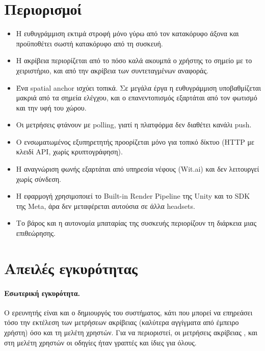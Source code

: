 \section{Περιορισμοί}
\label{sec:limitations}

\begin{itemize}
  \item Η ευθυγράμμιση εκτιμά στροφή μόνο γύρω από τον κατακόρυφο άξονα και προϋποθέτει σωστή κατακόρυφο από τη συσκευή.
  \item Η ακρίβεια περιορίζεται από το πόσο καλά ακουμπά ο χρήστης το σημείο με το χειριστήριο, και από την ακρίβεια των συντεταγμένων αναφοράς.
  \item Ένα spatial anchor ισχύει τοπικά. Σε μεγάλα έργα η ευθυγράμμιση υποβαθμίζεται μακριά από τα σημεία ελέγχου, και ο επανεντοπισμός εξαρτάται από τον φωτισμό και την υφή του χώρου.
  \item Οι μετρήσεις φτάνουν με polling, γιατί η πλατφόρμα δεν διαθέτει κανάλι push.
  \item Ο ενσωματωμένος εξυπηρετητής προορίζεται μόνο για τοπικό δίκτυο (HTTP με κλειδί API, χωρίς κρυπτογράφηση).
  \item Η αναγνώριση φωνής εξαρτάται από υπηρεσία νέφους (Wit.ai) και δεν λειτουργεί χωρίς σύνδεση.
  \item Η εφαρμογή χρησιμοποιεί το Built-in Render Pipeline της Unity και το SDK της Meta, άρα δεν μεταφέρεται αυτούσια σε άλλα headsets.
  \item Το βάρος και η αυτονομία μπαταρίας της συσκευής περιορίζουν τη διάρκεια μιας επιθεώρησης.
\end{itemize}


\section{Απειλές εγκυρότητας}
\label{sec:validity}

\paragraph{Εσωτερική εγκυρότητα.} Ο ερευνητής είναι και ο δημιουργός του συστήματος, κάτι που μπορεί να επηρεάσει τόσο την εκτέλεση των μετρήσεων ακρίβειας (καλύτερα αγγίγματα από έμπειρο χρήστη) όσο και τη μελέτη χρηστών. Για να περιοριστεί, οι μετρήσεις ακρίβειας , και στη μελέτη χρηστών οι οδηγίες ήταν γραπτές και ίδιες για όλους.

